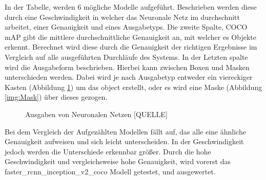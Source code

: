 \documentclass[a4paper,12pt,oneside]{article}
\begin{document}
In der Tabelle, werden 6 mögliche Modelle aufgeführt. Beschrieben werden diese durch eine Geschwindigkeit in welcher das Neuronale Netz im durchschnitt arbeitet, einer Genauigkeit und eines Ausgabetyps. Die zweite Spalte, COCO mAP gibt die mittlere durchschnittliche Genauigkeit an, mit welcher es Objekte erkennt. Berechnet wird diese durch die Genauigkeit der richtigen Ergebnisse im Vergleich auf alle ausgeführten Durchläufe des Systems. In der Letzten spalte wird die Ausgabeform beschrieben. Hierbei kann zwischen Boxen und Masken unterschieden werden. Dabei wird je nach Ausgabetyp entweder ein viereckiger Kasten (Abbildung \ref{img:Boxes}) um das object erstellt, oder es wird eine Maske (Abbildung \ref{img:Mask}) über dieses gezogen.

\begin{figure} 
	[h]
	\centering
    \label{img:Mask} 
    \label{img:Boxes} 
\caption{Ausgaben von Neuronalen Netzen [QUELLE]} 
\end{figure} 

\newpage

Bei dem Vergleich der Aufgezählten Modellen fällt auf, das alle eine ähnliche Genauigkeit aufweisen und sich leicht unterscheiden. In der Geschwindigkeit jedoch werden die Unterschiede erkennbar größer. Durch die hohe Geschwindigkeit und vergleichsweise hohe Genauigkeit, wird vorerst das faster\_rcnn\_inception\_v2\_coco Modell getestet, und ausgewertet.
\\
\end{document}
